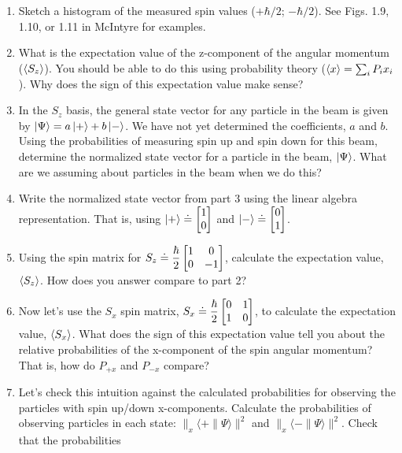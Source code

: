 \documentclass[
]{article}
\providecommand{\tightlist}{%
  \setlength{\itemsep}{0pt}\setlength{\parskip}{0pt}}
\providecommand{\tightlist}{%
  \setlength{\itemsep}{0pt}\setlength{\parskip}{0pt}}
\begin{document}
\begin{enumerate}
\def\labelenumi{\arabic{enumi}.}
\tightlist
\item
  Sketch a histogram of the measured spin values (\(+\hbar/2\);
  \(-\hbar/2\)). See Figs. 1.9, 1.10, or 1.11 in McIntyre for examples.
\item
  What is the expectation value of the z-component of the angular
  momentum (\(\braket{S_z}\)). You should be able to do this using
  probability theory (\(\braket{x} = \sum_i P_i x_i\)). Why does the
  sign of this expectation value make sense?
\item
  In the \(S_z\) basis, the general state vector for any particle in the
  beam is given by \(\ket{\Psi} = a\ket{+} + b\ket{-}\). We have not yet
  determined the coefficients, \(a\) and \(b\). Using the probabilities
  of measuring spin up and spin down for this beam, determine the
  normalized state vector for a particle in the beam, \(\ket{\Psi}\).
  What are we assuming about particles in the beam when we do this?
\item
  Write the normalized state vector from part 3 using the linear algebra
  representation. That is, using
  $\ket{+} \doteq \begin{bmatrix} 1 \cr 0 \end{bmatrix}$ and $\ket{-} \doteq \begin{bmatrix} 0 \cr 1\end{bmatrix}$.
\item
  Using the spin matrix for $S_z \doteq \dfrac{\hbar}{2} \begin{bmatrix} 1 & 0 \cr 0 & -1 \end{bmatrix}$, calculate the expectation value, \(\braket{S_z}\). How does you
  answer compare to part 2?
\item
  Now let's use the $S_x$ spin matrix, $S_x \doteq \dfrac{\hbar}{2}\begin{bmatrix} 0 & 1 \cr 1 & 0 \end{bmatrix}$, to calculate the expectation value, \(\braket{S_x}\). What does
  the sign of this expectation value tell you about the relative
  probabilities of the x-component of the spin angular momentum? That
  is, how do \(P_{+x}\) and \(P_{-x}\) compare?
\item
  Let's check this intuition against the calculated probabilities for
  observing the particles with spin up/down x-components. Calculate the
  probabilities of observing particles in each state:
  \(\|_x\langle + \| \Psi \rangle\|^2\) and
  \(\|_x\langle - \| \Psi \rangle\|^2\). Check that the probabilities

\end{enumerate}
\end{document}
